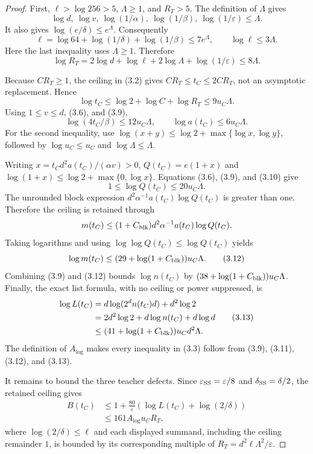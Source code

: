 \begin{proof}
First, \(\ell>\log256>5\), \(\Lambda\ge1\), and
\(R_T>5\). The definition of \(\Lambda\) gives
\[
\log d,\ \log v,\ \log(1/\alpha),\ \log(1/\beta),\
\log(1/\varepsilon)\le\Lambda.
\tag{3.6}
\]
It also gives
\(\log(e/\delta)\le e^\Lambda\). Consequently
\[
\ell
=\log64+\log(1/\delta)+\log(1/\beta)
\le 7e^\Lambda,
\qquad
\log\ell\le3\Lambda.
\tag{3.7}
\]
Here the last inequality uses \(\Lambda\ge1\). Therefore
\[
\log R_T
=2\log d+\log\ell+2\log\Lambda+\log(1/\varepsilon)
\le8\Lambda.
\tag{3.8}
\]

Because \(CR_T\ge1\), the ceiling in (3.2) gives
\(CR_T\le t_C\le2CR_T\), not an asymptotic replacement. Hence
\[
\log t_C\le\log2+\log C+\log R_T\le9u_C\Lambda.
\tag{3.9}
\]
Using \(1\le v\le d\), (3.6), and (3.9),
\[
\log(4t_C/\beta)\le12u_C\Lambda,
\qquad
\log a(t_C)\le6u_C\Lambda.
\tag{3.10}
\]
For the second inequality, use
\(\log(x+y)\le\log2+\max\{\log x,\log y\}\), followed by
\(\log u_C\le u_C\) and \(\log\Lambda\le\Lambda\).

Writing \(x=t_Cd^2a(t_C)/(\alpha v)>0\),
\(Q(t_C)=e(1+x)\) and
\(\log(1+x)\le\log2+\max\{0,\log x\}\). Equations (3.6), (3.9),
and (3.10) give
\[
1\le\log Q(t_C)\le20u_C\Lambda.
\tag{3.11}
\]
The unrounded block expression
\(d^2\alpha^{-1}a(t_C)\log Q(t_C)\) is greater than one. Therefore the
ceiling is retained through
\[
m(t_C)
\le(1+C_{\rm blk})d^2\alpha^{-1}a(t_C)\log Q(t_C).
\]
Taking logarithms and using
\(\log\log Q(t_C)\le\log Q(t_C)\) yields
\[
\log m(t_C)
\le(29+\log(1+C_{\rm blk}))u_C\Lambda.
\tag{3.12}
\]
Combining (3.9) and (3.12) bounds \(\log n(t_C)\) by
\((38+\log(1+C_{\rm blk}))u_C\Lambda\). Finally, the exact list formula,
with no ceiling or power suppressed, is
\[
\begin{aligned}
\log L(t_C)
&=d\log(2^dn(t_C)d)+d^2\log2\\
&=2d^2\log2+d\log n(t_C)+d\log d\\
&\le(41+\log(1+C_{\rm blk}))u_Cd^2\Lambda.
\end{aligned}
\tag{3.13}
\]
The definition of \(A_{\log}\) makes every inequality in (3.3) follow
from (3.9), (3.11), (3.12), and (3.13).

It remains to bound the three teacher defects. Since
\(\varepsilon_{\rm SS}=\varepsilon/8\) and
\(\delta_{\rm SS}=\delta/2\), the retained ceiling gives
\[
\begin{aligned}
B(t_C)
&\le1+\frac{80}{\varepsilon}
   \left(\log L(t_C)+\log(2/\delta)\right)\\
&\le161A_{\log}u_CR_T,
\end{aligned}
\tag{3.14}
\]
where \(\log(2/\delta)\le\ell\) and each displayed summand, including the
ceiling remainder \(1\), is bounded by its corresponding multiple of
\(R_T=d^2\ell\Lambda^2/\varepsilon\).


\end{proof}
